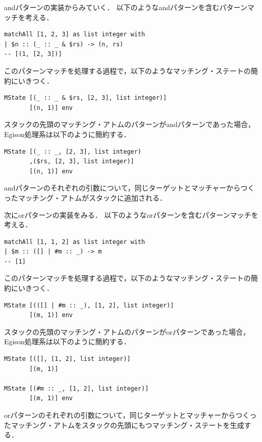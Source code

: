 andパターンの実装からみていく．
以下のようなandパターンを含むパターンマッチを考える．
\begin{lstlisting}[language=egison,numbers=none]
matchAll [1, 2, 3] as list integer with
| $n :: (_ :: _ & $rs) -> (n, rs)
-- [(1, [2, 3])]
\end{lstlisting}
このパターンマッチを処理する過程で，以下のようなマッチング・ステートの簡約にいきつく．
\begin{lstlisting}[language=egison,numbers=none]
MState [(_ :: _ & $rs, [2, 3], list integer)]
       [(n, 1)] env
\end{lstlisting}
スタックの先頭のマッチング・アトムのパターンがandパターンであった場合，Egison処理系は以下のように簡約する．
\begin{lstlisting}[language=egison,numbers=none]
MState [(_ :: _, [2, 3], list integer)
       ,($rs, [2, 3], list integer)]
       [(n, 1)] env
\end{lstlisting}
andパターンのそれぞれの引数について，同じターゲットとマッチャーからつくったマッチング・アトムがスタックに追加される．

次にorパターンの実装をみる．
以下のようなorパターンを含むパターンマッチを考える．
\begin{lstlisting}[language=egison,numbers=none]
matchAll [1, 1, 2] as list integer with
| $m :: ([] | #m :: _) -> m
-- [1]
\end{lstlisting}
このパターンマッチを処理する過程で，以下のようなマッチング・ステートの簡約にいきつく．
\begin{lstlisting}[language=egison,numbers=none]
MState [(([] | #m :: _), [1, 2], list integer)]
       [(m, 1)] env
\end{lstlisting}
スタックの先頭のマッチング・アトムのパターンがorパターンであった場合，Egison処理系は以下のように簡約する．
\begin{lstlisting}[language=egison,numbers=none]
MState [([], [1, 2], list integer)]
       [(m, 1)]

MState [(#m :: _, [1, 2], list integer)]
       [(m, 1)] env
\end{lstlisting}
orパターンのそれぞれの引数について，同じターゲットとマッチャーからつくったマッチング・アトムをスタックの先頭にもつマッチング・ステートを生成する．

